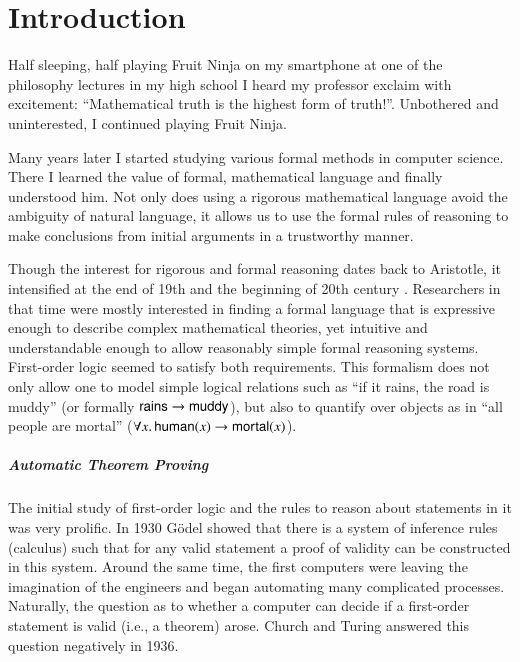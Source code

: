 \chapter{Introduction}
\label{introduction}

Half sleeping, half playing Fruit Ninja on my smartphone at one of the
philosophy lectures in my high school I heard my professor exclaim with
excitement: “Mathematical truth is the highest form of truth!”.
Unbothered and uninterested, I continued playing Fruit Ninja.

Many years later I started studying various formal methods in computer science.
There I learned the value of formal, mathematical language and finally
understood him. Not only does using a rigorous mathematical language avoid the
ambiguity of natural language, it allows us to use the formal rules of reasoning
to make conclusions from initial arguments in a trustworthy manner. 

Though the interest for rigorous and formal reasoning dates back to Aristotle,
it intensified at the end of 19th and the beginning of 20th century
\cite{jf-01-modern-logic}. Researchers in that time were mostly interested in
finding a formal language that is expressive enough to describe complex
mathematical theories, yet intuitive and understandable enough to allow
reasonably simple formal reasoning systems. First-order logic seemed to satisfy
both requirements.  This formalism does not only allow one to model simple
logical relations such as ``if it rains, the road is muddy'' (or formally
$\mathsf{rains} \rightarrow \mathsf{muddy}$), but also to quantify over objects as in ``all
people are mortal'' ($\forall x.\, \mathsf{human}(x) \rightarrow \mathsf{mortal}(x)$).

\paragraph{Automatic Theorem Proving}The initial study of first-order logic and the rules to reason about statements in
it was very prolific. In 1930 G\"odel \cite{kg-30-completeness-theorem} showed
that there is a system of inference rules (calculus) such that for any valid
statement a proof of validity can be constructed in this system. Around the same
time, the first computers were leaving the imagination of the engineers and
began automating many complicated processes.  Naturally, the question as to
whether a computer can decide if a first-order statement is valid (i.e., a
theorem) arose. Church \cite{ac-36-fol-undecidable} and Turing
\cite{tm-37-undecidable} answered this question negatively in 1936.

